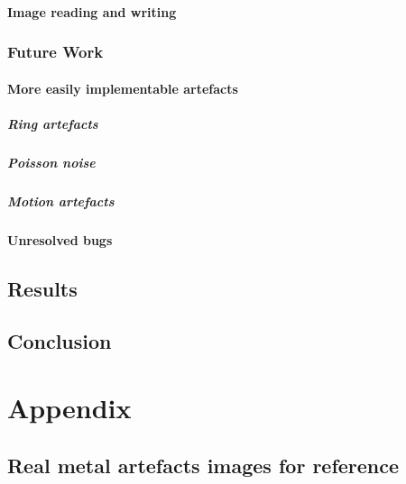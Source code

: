 \subsection{Image reading and writing}
\section{Future Work}
\subsection{More easily implementable artefacts}
\subsubsection{Ring artefacts}
\subsubsection{Poisson noise}
\subsubsection{Motion artefacts}
\subsection{Unresolved bugs}

\chapter{Results}

\chapter{Conclusion}




%
%
\part*{Appendix}

\appendix %
\chapter{Real metal artefacts images for reference}
\label{chapter:RealMetal}

